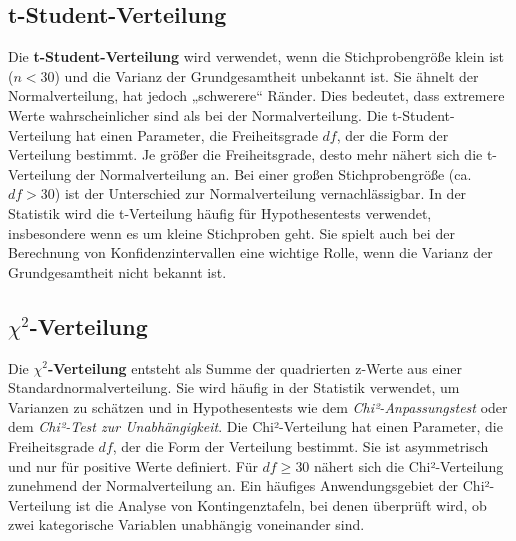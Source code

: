 \subsection{t-Student-Verteilung}
\label{sec:t_student_distribution}
Die \textbf{t-Student-Verteilung} wird verwendet, wenn die Stichprobengröße klein ist (\(n < 30\)) und die Varianz der Grundgesamtheit unbekannt ist. Sie ähnelt der Normalverteilung, hat jedoch „schwerere“ Ränder. Dies bedeutet, dass extremere Werte wahrscheinlicher sind als bei der Normalverteilung.
Die t-Student-Verteilung hat einen Parameter, die Freiheitsgrade \(df\), der die Form der Verteilung bestimmt. Je größer die Freiheitsgrade, desto mehr nähert sich die t-Verteilung der Normalverteilung an. Bei einer großen Stichprobengröße (ca. \(df > 30\)) ist der Unterschied zur Normalverteilung vernachlässigbar.
In der Statistik wird die t-Verteilung häufig für Hypothesentests verwendet, insbesondere wenn es um kleine Stichproben geht. Sie spielt auch bei der Berechnung von Konfidenzintervallen eine wichtige Rolle, wenn die Varianz der Grundgesamtheit nicht bekannt ist.


\subsection{$\chi^2$-Verteilung}
\label{sec:chi_square_distribution}
Die \textbf{$\chi^2$-Verteilung} entsteht als Summe der quadrierten z-Werte aus einer Standardnormalverteilung. Sie wird häufig in der Statistik verwendet, um Varianzen zu schätzen und in Hypothesentests wie dem \textit{Chi²-Anpassungstest} oder dem \textit{Chi²-Test zur Unabhängigkeit}.
Die Chi²-Verteilung hat einen Parameter, die Freiheitsgrade \(df\), der die Form der Verteilung bestimmt. Sie ist asymmetrisch und nur für positive Werte definiert. Für \(df \geq 30\) nähert sich die Chi²-Verteilung zunehmend der Normalverteilung an.
Ein häufiges Anwendungsgebiet der Chi²-Verteilung ist die Analyse von Kontingenztafeln, bei denen überprüft wird, ob zwei kategorische Variablen unabhängig voneinander sind.

